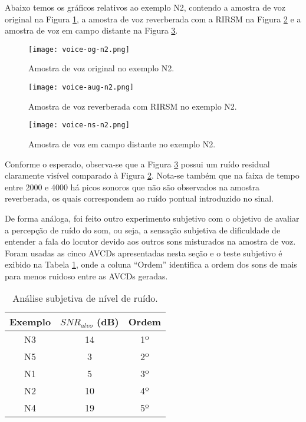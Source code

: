 Abaixo temos os gráficos relativos ao exemplo N2, contendo a amostra de voz original na Figura \ref{fig:voice-og-n2}, a amostra de voz reverberada
com a RIRSM na Figura \ref{fig:voice-aug-n2} e a amostra de voz em campo distante na Figura \ref{fig:voice-ns-n2}.

\begin{figure} [H]
    \centering
    \texttt{[image: voice-og-n2.png]}
    \caption{Amostra de voz original no exemplo N2.}
    \label{fig:voice-og-n2}
\end{figure} 

\begin{figure} [H]
    \centering
    \texttt{[image: voice-aug-n2.png]}
    \caption{Amostra de voz reverberada com RIRSM no exemplo N2.}
    \label{fig:voice-aug-n2}
\end{figure} 

\begin{figure} [H]
    \centering
    \texttt{[image: voice-ns-n2.png]}
    \caption{Amostra de voz em campo distante no exemplo N2.}
    \label{fig:voice-ns-n2}
\end{figure} 

Conforme o esperado, observa-se que a Figura \ref{fig:voice-ns-n2} possui um ruído residual claramente visível comparado à Figura \ref{fig:voice-aug-n2}.
Nota-se também que na faixa de tempo entre 2000 e 4000 há picos sonoros que não são observados na amostra reverberada, os quais correspondem ao ruído pontual
introduzido no sinal.

De forma análoga, foi feito outro experimento subjetivo com o objetivo de avaliar a percepção de ruído do som, ou seja, 
a sensação subjetiva de dificuldade de entender a fala do locutor devido aos outros sons misturados na amostra de voz.
Foram usadas as cinco AVCDs apresentadas nesta seção e o teste subjetivo é exibido na Tabela \ref{tbl:noise-exp}, onde
a coluna “Ordem” identifica a ordem dos sons de mais para menos ruidoso entre as AVCDs geradas.

\begin{table} [H]
    \centering
    \caption{Análise subjetiva de nível de ruído.}
    \label{tbl:noise-exp}
    \begin{tabular}{c|c|c}

        \textbf{Exemplo} & 
        \textbf{$SNR_{alvo}$ (dB)} & 
        \textbf{Ordem} \\
        \hline 

        N3 & 14 & 1º \\
        N5 &  3 & 2º \\
        N1 &  5 & 3º \\
        N2 & 10 & 4º \\
        N4 & 19 & 5º \\
        

    \end{tabular}
\end{table}

